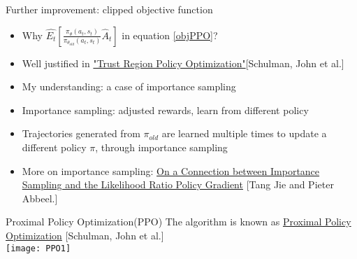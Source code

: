 \begin{frame}{Further improvement: clipped objective function}
    \begin{itemize}

        \item Why $\hat{E_t}[\frac{\pi_\theta(a_t,s_t)}{\pi_{\theta_{old}}(a_t,s_t)}\hat{A}_{t}]$ in equation \ref{objPPO}?\\\vspace{0.2cm}
        \item Well justified in \href{https://arxiv.org/pdf/1502.05477.pdf}{"Trust Region Policy Optimization"}\textcolor{CUHKgreen}{\footnotesize[Schulman, John et al.]}\\\vspace{0.2cm}
        \item My understanding: a case of importance sampling\\\vspace{0.2cm}
        \item Importance sampling: adjusted rewards, learn from different policy\\\vspace{0.2cm}
        \item Trajectories generated from $\pi_{old}$ are learned multiple times to update a different policy $\pi$, through importance sampling\\\vspace{0.2cm}
        \item More on importance sampling: \href{http://rll.berkeley.edu/~jietang/pubs/nips10_Tang.pdf}{On a Connection between Importance Sampling and
the Likelihood Ratio Policy Gradient} \textcolor{CUHKgreen}{\footnotesize[Tang Jie and Pieter Abbeel.]}
    \end{itemize}

\end{frame}

\begin{frame}{Proximal Policy Optimization(PPO)}
    \vspace{0.15cm}
    The algorithm is known as \href{https://arxiv.org/pdf/1707.06347.pdf}{Proximal Policy Optimization} \textcolor{CUHKgreen}{\footnotesize[Schulman, John et al.]}\\\vspace{0.15cm}
    \texttt{[image: PPO1]}
\end{frame}

